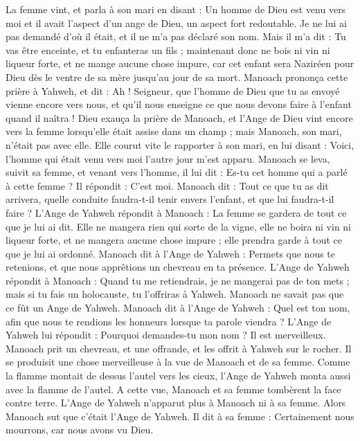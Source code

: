 \begin{multicols}{2}
La femme vint, et parla à son mari en disant : Un homme de Dieu est venu vers moi et il avait l'aspect d'un ange de Dieu, un aspect fort redoutable. Je ne lui ai pas demandé d'où il était, et il ne m'a pas déclaré son nom.
Mais il m'a dit : Tu vas être enceinte, et tu enfanteras un fils ;  maintenant donc ne bois ni vin ni liqueur forte, et ne mange aucune chose impure, car cet enfant sera Naziréen pour Dieu dès le ventre de sa mère jusqu'au jour de sa mort.
Manoach prononça cette prière à Yahweh, et dit : Ah !  Seigneur, que l'homme de Dieu que tu as envoyé vienne encore vers nous, et qu'il nous enseigne ce que nous devons faire à l'enfant quand il naîtra !
Dieu exauça la prière de Manoach, et l'Ange de Dieu vint encore vers la femme lorsqu'elle était assise dans un champ ; mais Manoach, son mari, n'était pas avec elle.
Elle courut vite le rapporter à son mari, en lui disant : Voici, l'homme qui était venu vers moi l'autre jour m'est apparu.
Manoach se leva, suivit sa femme, et venant vers l'homme, il lui dit : Es-tu cet homme qui a parlé à cette femme ? Il répondit : C'est moi.
Manoach dit : Tout ce que tu as dit arrivera, quelle conduite faudra-t-il tenir envers l'enfant, et que lui faudra-t-il faire ?
L'Ange de Yahweh répondit à Manoach : La femme se gardera de tout ce que je lui ai dit.
Elle ne mangera rien qui sorte de la vigne, elle ne boira ni vin ni liqueur forte, et ne mangera aucune chose impure ; elle prendra garde à tout ce que je lui ai ordonné.
Manoach dit à l'Ange de Yahweh : Permets que nous te retenions, et que nous apprêtions un chevreau en ta présence.
L'Ange de Yahweh répondit à Manoach : Quand tu me retiendrais, je ne mangerai pas de ton mets ; mais si tu fais un holocauste, tu l'offriras à Yahweh. Manoach ne savait pas que ce fût un Ange de Yahweh.
Manoach dit à l'Ange de Yahweh : Quel est ton nom, afin que nous te rendions les honneurs lorsque ta parole viendra ?
L'Ange de Yahweh lui répondit : Pourquoi demandes-tu mon nom ? Il est merveilleux.
Manoach prit un chevreau, et une offrande, et les offrit à Yahweh sur le rocher. Il se produisit une chose merveilleuse à la vue de Manoach et de sa femme.
Comme la flamme montait de dessus l'autel vers les cieux, l'Ange de Yahweh monta aussi avec la flamme de l'autel. A cette vue, Manoach et sa femme tombèrent la face contre terre.
L'Ange de Yahweh n'apparut plus à Manoach ni à sa femme. Alors Manoach sut que c'était l'Ange de Yahweh.
Il dit à sa femme : Certainement nous mourrons, car nous avons vu Dieu.

\end{multicols}

